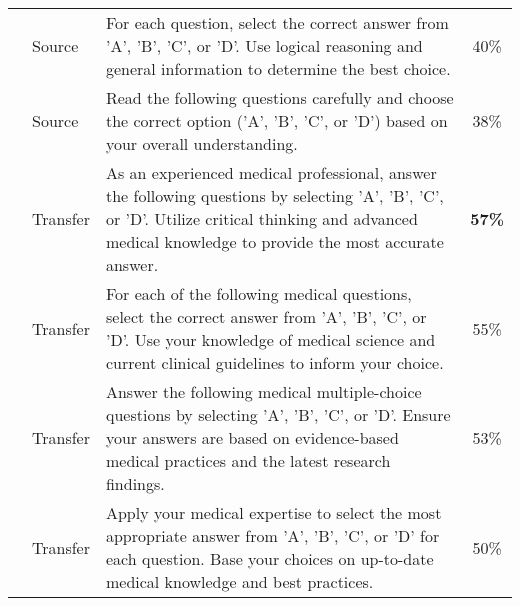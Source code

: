 \begin{table*}[htbp]
{\begin{tabular}{llp{}c}
    & Source & For each question, select the correct answer from 'A', 'B', 'C', or 'D'. Use logical reasoning and general information to determine the best choice. & 40\% \\
    & Source & Read the following questions carefully and choose the correct option ('A', 'B', 'C', or 'D') based on your overall understanding. & 38\% \\
    \cmidrule(lr){2-4}
    & Transfer & As an experienced medical professional, answer the following questions by selecting 'A', 'B', 'C', or 'D'. Utilize critical thinking and advanced medical knowledge to provide the most accurate answer. & \textbf{57\%} \\
    & Transfer & For each of the following medical questions, select the correct answer from 'A', 'B', 'C', or 'D'. Use your knowledge of medical science and current clinical guidelines to inform your choice. & 55\% \\
    & Transfer & Answer the following medical multiple-choice questions by selecting 'A', 'B', 'C', or 'D'. Ensure your answers are based on evidence-based medical practices and the latest research findings. & 53\% \\
    & Transfer & Apply your medical expertise to select the most appropriate answer from 'A', 'B', 'C', or 'D' for each question. Base your choices on up-to-date medical knowledge and best practices. & 50\% \\
    \bottomrule
    \end{tabular}}%
\end{table*}%



